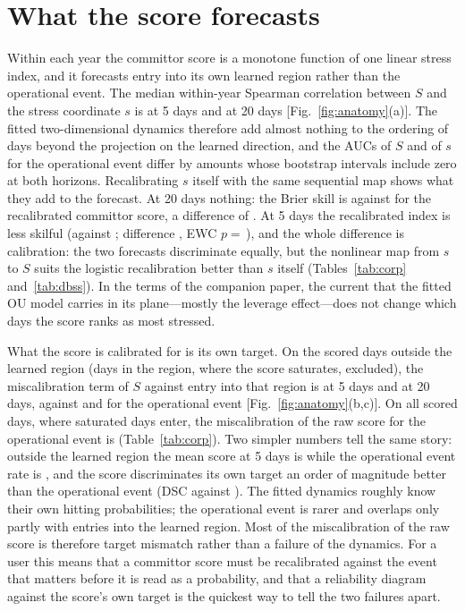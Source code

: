 \documentclass[preprint,12pt,authoryear]{elsarticle}
\newcommand{\Sraw}{S}
\begin{document}
\section{What the score forecasts}\label{sec:what}
Within each year the committor score is a monotone function of one linear stress index, and it forecasts entry into its own learned region rather than the operational event. The median within-year Spearman correlation between $\Sraw$ and the stress coordinate $s$ is \SpearmanFive at 5 days and \SpearmanTwenty at 20 days [Fig.~\ref{fig:anatomy}(a)]. The fitted two-dimensional dynamics therefore add almost nothing to the ordering of days beyond the projection on the learned direction, and the AUCs of $\Sraw$ and of $s$ for the operational event differ by amounts whose bootstrap intervals include zero at both horizons. Recalibrating $s$ itself with the same sequential map shows what they add to the forecast. At 20 days nothing: the Brier skill is \BSSsTwenty against \BSSouTwenty for the recalibrated committor score, a difference of \dBSSsTwenty [\dBSSsTwentyLo, \dBSSsTwentyHi]. At 5 days the recalibrated index is less skilful (\BSSsFive against \BSSouFive; difference \dBSSsFive [\dBSSsFiveLo, \dBSSsFiveHi], EWC $p=\,$\pEWCsFive), and the whole difference is calibration: the two forecasts discriminate equally, but the nonlinear map from $s$ to $\Sraw$ suits the logistic recalibration better than $s$ itself (Tables~\ref{tab:corp} and~\ref{tab:dbss}). In the terms of the companion paper, the current that the fitted OU model carries in its plane---mostly the leverage effect---does not change which days the score ranks as most stressed.

What the score is calibrated for is its own target. On the \NoutB scored days outside the learned region (days in the region, where the score saturates, excluded), the miscalibration term of $\Sraw$ against entry into that region is \MCBownFive at 5 days and \MCBownTwenty at 20 days, against \MCBoperFive and \MCBoperTwenty for the operational event [Fig.~\ref{fig:anatomy}(b,c)]. On all \nDaysFive scored days, where saturated days enter, the miscalibration of the raw score for the operational event is \MCBrawFive (Table~\ref{tab:corp}). Two simpler numbers tell the same story: outside the learned region the mean score at 5 days is \MeanSoutB while the operational event rate is \RateOperOutB, and the score discriminates its own target an order of magnitude better than the operational event (DSC \DSCownFive against \DSCoperFive). The fitted dynamics roughly know their own hitting probabilities; the operational event is rarer and overlaps only partly with entries into the learned region. Most of the miscalibration of the raw score is therefore target mismatch rather than a failure of the dynamics. For a user this means that a committor score must be recalibrated against the event that matters before it is read as a probability, and that a reliability diagram against the score's own target is the quickest way to tell the two failures apart.
\end{document}
